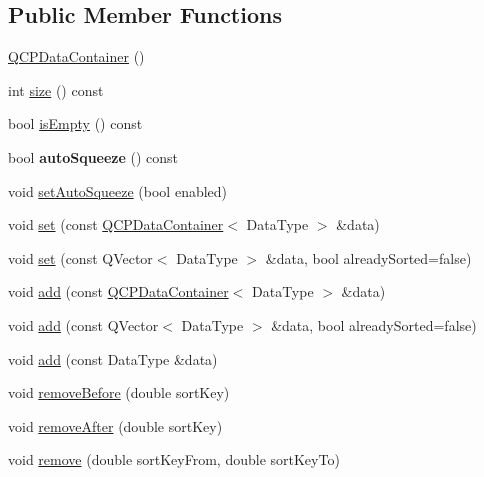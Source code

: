 \subsection*{Public Member Functions}
\begin{DoxyCompactItemize}
\item 
\hyperlink{class_q_c_p_data_container_af86c0c63719f92c360ff67cc06c6fe6f}{Q\+C\+P\+Data\+Container} ()
\item 
int \hyperlink{class_q_c_p_data_container_a8e9b262c739672e13472d0d45b720258}{size} () const
\item 
bool \hyperlink{class_q_c_p_data_container_a7bdebfccd2f9f84bf032882f9d6b00a8}{is\+Empty} () const
\item 
\mbox{\label{class_q_c_p_data_container_a64f0f1621ca46de2352eaf87476db9b1}} 
bool {\bfseries auto\+Squeeze} () const
\item 
void \hyperlink{class_q_c_p_data_container_a233f866760a78950d2a393c1a4bc54b5}{set\+Auto\+Squeeze} (bool enabled)
\item 
void \hyperlink{class_q_c_p_data_container_ae7042bd534fc3ce7befa2ce3f790b5bf}{set} (const \hyperlink{class_q_c_p_data_container}{Q\+C\+P\+Data\+Container}$<$ Data\+Type $>$ \&data)
\item 
void \hyperlink{class_q_c_p_data_container_aff99fffbb26597a354c4bc8312596ab2}{set} (const Q\+Vector$<$ Data\+Type $>$ \&data, bool already\+Sorted=false)
\item 
void \hyperlink{class_q_c_p_data_container_a42b98bd994307ccd163a43d576f91ad9}{add} (const \hyperlink{class_q_c_p_data_container}{Q\+C\+P\+Data\+Container}$<$ Data\+Type $>$ \&data)
\item 
void \hyperlink{class_q_c_p_data_container_a51d2a4c9ce4baf5e950b767d26673972}{add} (const Q\+Vector$<$ Data\+Type $>$ \&data, bool already\+Sorted=false)
\item 
void \hyperlink{class_q_c_p_data_container_a715e8e9972466804954a2f8fbd5288b7}{add} (const Data\+Type \&data)
\item 
void \hyperlink{class_q_c_p_data_container_aa7f74cbce304b0369e1626c3798e1eda}{remove\+Before} (double sort\+Key)
\item 
void \hyperlink{class_q_c_p_data_container_abbe5d87ffc10b5aeffa5bb42cf03aa3c}{remove\+After} (double sort\+Key)
\item 
void \hyperlink{class_q_c_p_data_container_ae5f569a120648b167efa78835f12fd38}{remove} (double sort\+Key\+From, double sort\+Key\+To)

\end{DoxyCompactItemize}
